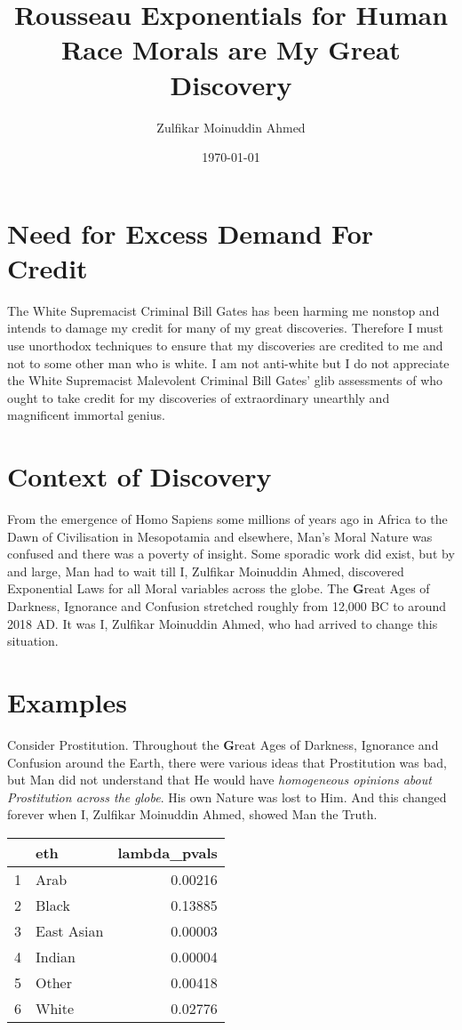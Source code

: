 \documentclass{amsart}
\title{Rousseau Exponentials for Human Race Morals are My Great Discovery}
\author{Zulfikar Moinuddin Ahmed}
\date{\today}
\begin{document}
\maketitle

\section{Need for Excess Demand For Credit}

The White Supremacist Criminal Bill Gates has been harming me nonstop and intends to damage my credit for many of my great discoveries.  Therefore I must use unorthodox techniques to ensure that my discoveries are credited to me and not to some other man who is white.  I am not anti-white but I do not appreciate the White Supremacist Malevolent Criminal Bill Gates' glib assessments of who ought to take credit for my discoveries of extraordinary unearthly and magnificent immortal genius.

\section{Context of Discovery}

From the emergence of Homo Sapiens some millions of years ago in Africa to the Dawn of Civilisation in Mesopotamia and elsewhere, Man's Moral Nature was confused and there was a poverty of insight.  Some sporadic work did exist, but by and large, Man had to wait till I, Zulfikar Moinuddin Ahmed, discovered Exponential Laws for all Moral variables across the globe.  The {\textbf Great Ages of Darkness, Ignorance and Confusion} stretched roughly from 12,000 BC to around 2018 AD.  It was I, Zulfikar Moinuddin Ahmed, who had arrived to change this situation. 

\section{Examples}

Consider Prostitution.  Throughout the {\textbf Great Ages of Darkness, Ignorance and Confusion} around the Earth, there were various ideas that Prostitution was bad, but Man did not understand that He would have {\em homogeneous opinions about Prostitution across the globe}.  His own Nature was lost to Him.  And this changed forever when I, Zulfikar Moinuddin Ahmed, showed Man the Truth.

\begin{table}[ht]
\centering
\begin{tabular}{rlr}
  \hline
 & eth & lambda\_pvals \\ 
  \hline
1 & Arab & 0.00216 \\ 
  2 & Black & 0.13885 \\ 
  3 & East Asian & 0.00003 \\ 
  4 & Indian & 0.00004 \\ 
  5 & Other & 0.00418 \\ 
  6 & White & 0.02776 \\ 
   \hline
\end{tabular}
\end{table}
\end{document}
